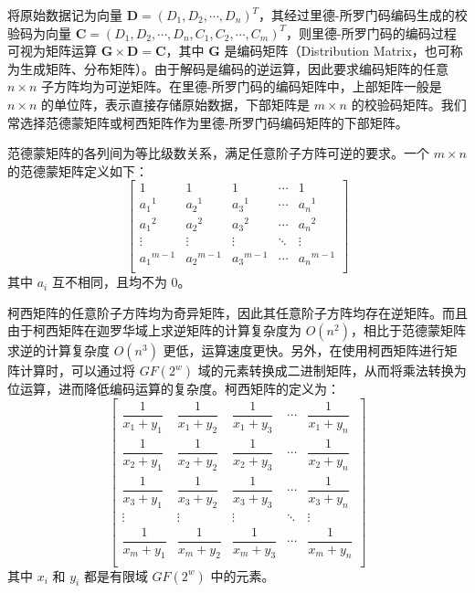 将原始数据记为向量 $\boldsymbol{D}=(D_1,D_2,\cdots,D_n)^{T}$，其经过里德-所罗门码编码生成的校验码为向量 $\boldsymbol{C}=(D_1,D_2,\cdots,D_n,C_1,C_2,\cdots,C_m)^{T}$，则里德-所罗门码的编码过程可视为矩阵运算 $\boldsymbol{G}{\times}\boldsymbol{D}=\boldsymbol{C}$，其中 $\boldsymbol{G}$ 是编码矩阵（Distribution Matrix，也可称为生成矩阵、分布矩阵）。由于解码是编码的逆运算，因此要求编码矩阵的任意 $n{\times}n$ 子方阵均为可逆矩阵。在里德-所罗门码的编码矩阵中，上部矩阵一般是 $n{\times}n$ 的单位阵，表示直接存储原始数据，下部矩阵是  $m{\times}n$ 的校验码矩阵。我们常选择范德蒙矩阵\cite{reed1960polynomial}或柯西矩阵\cite{roth1989mds}作为里德-所罗门码编码矩阵的下部矩阵。

范德蒙矩阵的各列间为等比级数关系，满足任意阶子方阵可逆的要求。一个 $m{\times}n$ 的范德蒙矩阵定义如下：
\begin{equation}
\begin{bmatrix}
1 & 1 & 1 & \cdots & 1 \\
{a_1}^1 & {a_2}^1 & {a_3}^1 & \cdots & {a_n}^1 \\
{a_1}^2 & {a_2}^2 & {a_3}^2 & \cdots & {a_n}^2 \\
\vdots & \vdots & \vdots & \ddots & \vdots \\
{a_1}^{m-1} & {a_2}^{m-1} & {a_3}^{m-1} & \cdots & {a_n}^{m-1} \\
\end{bmatrix}
\end{equation}
其中 $a_i$ 互不相同，且均不为 0。

柯西矩阵的任意阶子方阵均为奇异矩阵，因此其任意阶子方阵均存在逆矩阵。而且由于柯西矩阵在迦罗华域上求逆矩阵的计算复杂度为 $O(n^2)$，相比于范德蒙矩阵求逆的计算复杂度 $O(n^3)$ 更低，运算速度更快。另外，在使用柯西矩阵进行矩阵计算时，可以通过将 $GF(2^w)$ 域的元素转换成二进制矩阵，从而将乘法转换为位运算，进而降低编码运算的复杂度。柯西矩阵的定义为：
\begin{equation}
\begin{bmatrix}
\dfrac{1}{x_1+y_1} & \dfrac{1}{x_1+y_2} & \dfrac{1}{x_1+y_3} & \cdots & \dfrac{1}{x_1+y_n} \\
\dfrac{1}{x_2+y_1} & \dfrac{1}{x_2+y_2} & \dfrac{1}{x_2+y_3} & \cdots & \dfrac{1}{x_2+y_n} \\
\dfrac{1}{x_3+y_1} & \dfrac{1}{x_3+y_2} & \dfrac{1}{x_3+y_3} & \cdots & \dfrac{1}{x_3+y_n} \\
\vdots & \vdots & \vdots & \ddots & \vdots \\
\dfrac{1}{x_m+y_1} & \dfrac{1}{x_m+y_2} & \dfrac{1}{x_m+y_3} & \cdots & \dfrac{1}{x_m+y_n} \\
\end{bmatrix}
\end{equation}
其中 $x_i$ 和 $y_i$ 都是有限域 $GF(2^w)$ 中的元素。

